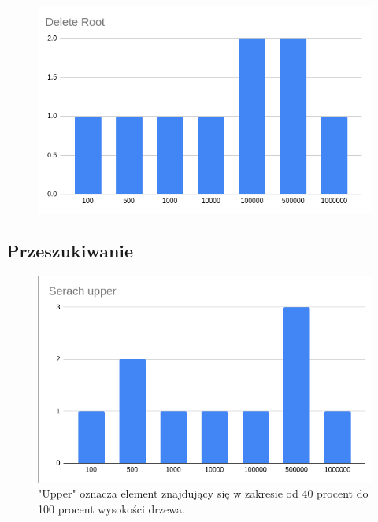 \documentclass{article}
\begin{document}
\begin{figure}[H]
    \centering
    \includegraphics[width=\textwidth]{"../assets/4_8.png"}
    \label{fig:4_8}
\end{figure}



\subsection*{Przeszukiwanie}

\begin{figure}[H]
    \centering
    \includegraphics[width=\textwidth]{"../assets/4_3.png"}
    \caption{"Upper" oznacza element znajdujący się w zakresie od 40 procent do 100 procent wysokości drzewa.}
    \label{fig:4_3}
\end{figure}
\end{document}
